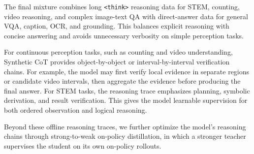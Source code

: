 \documentclass{llmxive}
\begin{document}
The final mixture combines long \texttt{<think>} reasoning data for STEM, counting, video reasoning, and complex image-text QA with direct-answer data for general VQA, caption, OCR, and grounding. This balances explicit reasoning with concise answering and avoids unnecessary verbosity on simple perception tasks.

For continuous perception tasks, such as counting and video understanding, Synthetic CoT provides object-by-object or interval-by-interval verification chains. For example, the model may first verify local evidence in separate regions or candidate video intervals, then aggregate the evidence before producing the final answer. For STEM tasks, the reasoning trace emphasizes planning, symbolic derivation, and result verification. This gives the model learnable supervision for both ordered observation and logical reasoning. 

Beyond these offline reasoning traces, we further optimize the model's reasoning chains through strong-to-weak on-policy distillation, in which a stronger teacher supervises the student on its own on-policy rollouts.



\end{document}

